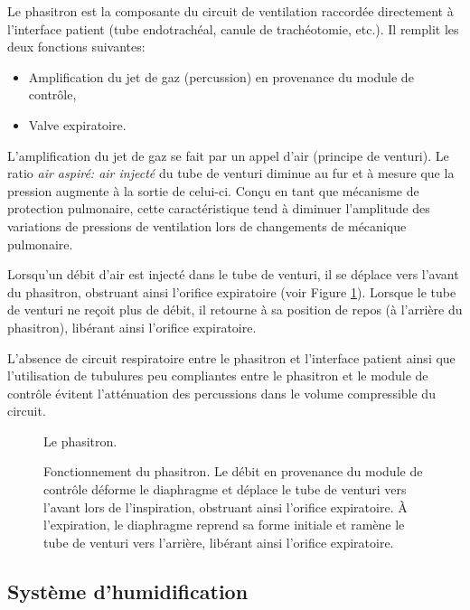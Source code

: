 Le phasitron est la composante du circuit de ventilation raccordée
directement à l'interface patient (tube endotrachéal, canule de
trachéotomie, etc.). Il remplit les deux fonctions suivantes: 

\begin{itemize} 
	\item Amplification du jet de gaz (percussion) en provenance du
		module de contrôle,
	\item Valve expiratoire.
\end{itemize}

L'amplification du jet de gaz se fait par un appel d'air (principe de
venturi).  Le ratio \emph{air aspiré: air injecté} du tube de venturi
diminue au fur et à mesure que la pression augmente à la sortie de
celui-ci. Conçu en tant que mécanisme de protection pulmonaire, cette
caractéristique tend à diminuer l'amplitude des variations de
pressions de ventilation lors de changements de mécanique pulmonaire.

Lorsqu'un débit d'air est injecté dans le tube de venturi, il se
déplace vers l'avant du phasitron, obstruant ainsi l'orifice
expiratoire (voir Figure \ref{fig:phasitron-coupe}). Lorsque le tube
de venturi ne reçoit plus de débit, il retourne à sa position de repos
(à l'arrière du phasitron), libérant ainsi l'orifice expiratoire.

L'absence de circuit respiratoire entre le phasitron et l'interface
patient ainsi que l'utilisation de tubulures peu compliantes entre le
phasitron et le module de contrôle évitent l'atténuation des
percussions dans le volume compressible du circuit.

\begin{figure}
	
	\caption{Le phasitron.}
\end{figure}

\begin{figure}
	
	\caption[Fonctionnement du phasitron.]{Fonctionnement du phasitron.
	Le débit en provenance du module de contrôle déforme le diaphragme
	et déplace le tube de venturi vers l'avant lors de l'inspiration,
	obstruant ainsi l’orifice expiratoire. À l'expiration, le diaphragme
	reprend sa forme initiale et ramène le tube de venturi vers
	l'arrière, libérant ainsi l'orifice expiratoire.} 
	\label{fig:phasitron-coupe}
\end{figure}

\subsection{Système d’humidification}

